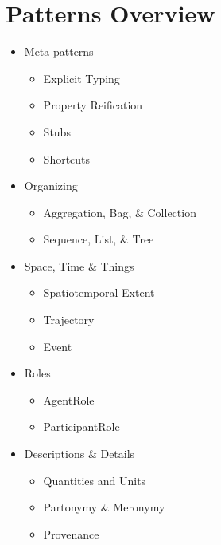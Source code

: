 \section{Patterns Overview}
\label{ssec:pats}
\begin{itemize}
\item Meta-patterns
\begin{itemize}
\item Explicit Typing
\item Property Reification
\item Stubs
\item Shortcuts
\end{itemize}
\item Organizing
\begin{itemize}
\item Aggregation, Bag, \& Collection
\item Sequence, List, \& Tree
\end{itemize}
\item Space, Time \& Things
\begin{itemize}
\item Spatiotemporal Extent
\item Trajectory
\item Event
\end{itemize}
\item Roles
\begin{itemize}
\item AgentRole
\item ParticipantRole
\end{itemize}
\item Descriptions \& Details
\begin{itemize}
\item Quantities and Units
\item Partonymy \& Meronymy
\item Provenance
\end{itemize}
\end{itemize}


